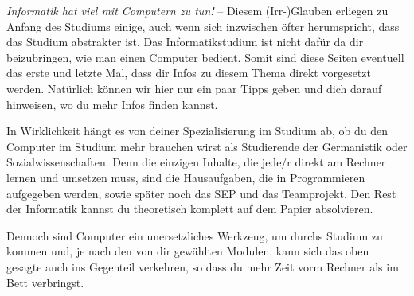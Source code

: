 
\emph{Informatik hat viel mit Computern zu tun!} -- Diesem \mbox{(Irr-)Glauben} erliegen zu Anfang des Studiums einige, auch wenn sich inzwischen öfter herumspricht, dass das Studium abstrakter ist. 
Das Informatikstudium ist nicht dafür da dir beizubringen, wie man einen Computer bedient. 
Somit sind diese Seiten eventuell das erste und letzte Mal, dass dir Infos zu diesem Thema direkt vorgesetzt werden. 
Natürlich können wir hier nur ein paar Tipps geben und dich darauf hinweisen, wo du mehr Infos finden kannst.

In Wirklichkeit hängt es von deiner Spezialisierung im Studium ab, ob du den Computer im Studium mehr brauchen wirst als Studierende der Germanistik oder Sozialwissenschaften. 
Denn die einzigen Inhalte, die jede/r direkt am Rechner lernen und umsetzen muss, sind die Hausaufgaben, die in Programmieren aufgegeben werden, sowie später noch das SEP und das Teamprojekt. 
Den Rest der Informatik kannst du theoretisch komplett auf dem Papier absolvieren.

Dennoch sind Computer ein unersetzliches Werkzeug, um durchs Studium zu kommen und, je nach den von dir gewählten Modulen, kann sich das oben gesagte auch ins Gegenteil verkehren, so dass du mehr Zeit vorm Rechner als im Bett verbringst.

